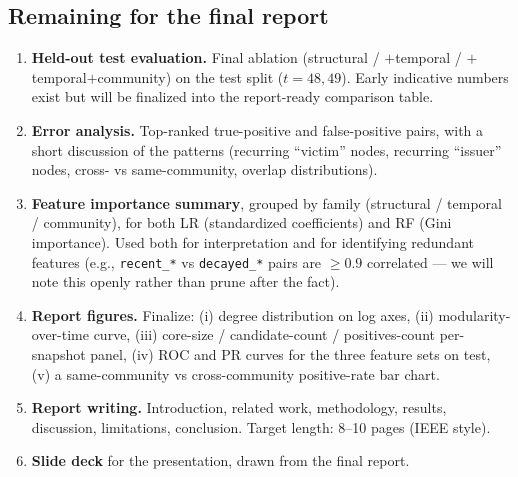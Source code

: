\documentclass[11pt,a4paper]{article}
\newcommand{\code}[1]{\texttt{#1}}
\begin{document}
\subsection{Remaining for the final report}
\begin{enumerate}[nosep,label=\arabic*.]
  \item \textbf{Held-out test evaluation.} Final ablation
        (structural / $+$temporal / $+$temporal$+$community) on the test
        split ($t = 48, 49$). Early indicative numbers exist but will be
        finalized into the report-ready comparison table.
  \item \textbf{Error analysis.} Top-ranked true-positive and false-positive
        pairs, with a short discussion of the patterns (recurring ``victim''
        nodes, recurring ``issuer'' nodes, cross- vs same-community,
        overlap distributions).
  \item \textbf{Feature importance summary}, grouped by family (structural /
        temporal / community), for both LR (standardized coefficients) and
        RF (Gini importance). Used both for interpretation and for
        identifying redundant features (e.g., \code{recent\_*} vs
        \code{decayed\_*} pairs are $\geq 0.9$ correlated --- we will note
        this openly rather than prune after the fact).
  \item \textbf{Report figures.} Finalize: (i) degree distribution on log
        axes, (ii) modularity-over-time curve, (iii) core-size /
        candidate-count / positives-count per-snapshot panel, (iv) ROC and
        PR curves for the three feature sets on test, (v) a same-community
        vs cross-community positive-rate bar chart.
  \item \textbf{Report writing.} Introduction, related work, methodology,
        results, discussion, limitations, conclusion. Target length: 8--10
        pages (IEEE style).
  \item \textbf{Slide deck} for the presentation, drawn from the final
        report.
\end{enumerate}
\end{document}
